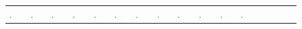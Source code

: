 \documentclass[letterpaper]{article} %
\begin{document}
\begin{figure}[!h]
\begin{tabular}{ C{1.07cm}C{1.07cm}C{1.07cm}C{1.07cm}C{1.07cm}C{1.07cm}C{1.07cm}C{1.07cm}C{1.07cm}C{1.07cm}C{1.07cm}C{1.07cm}C{1.07cm}C{1.07cm}C{1.07cm}C{1.07cm} }
    \includegraphics[width=0.070\textwidth]{"images/supp_fig_mnist/seq_4/t_m_3"} &
    \includegraphics[width=0.070\textwidth]{"images/supp_fig_mnist/seq_4/t_m_2"} &
    \includegraphics[width=0.070\textwidth]{"images/supp_fig_mnist/seq_4/t_m_1"} &
    \includegraphics[width=0.070\textwidth]{"images/supp_fig_mnist/seq_4/t_m_0"} &
    \includegraphics[width=0.070\textwidth]{"images/supp_fig_mnist/seq_4/pred_0"}&
    \includegraphics[width=0.070\textwidth]{"images/supp_fig_mnist/seq_4/pred_1"}&
    \includegraphics[width=0.070\textwidth]{"images/supp_fig_mnist/seq_4/pred_2"}&
    \includegraphics[width=0.070\textwidth]{"images/supp_fig_mnist/seq_4/pred_3"}&
    \includegraphics[width=0.070\textwidth]{"images/supp_fig_mnist/seq_4/pred_4"}&
    \includegraphics[width=0.070\textwidth]{"images/supp_fig_mnist/seq_4/pred_5"}&
    \includegraphics[width=0.070\textwidth]{"images/supp_fig_mnist/seq_4/pred_6"}&
    \includegraphics[width=0.070\textwidth]{"images/supp_fig_mnist/seq_4/pred_7"}\\
    

\end{tabular}
\end{figure}
\end{document}
